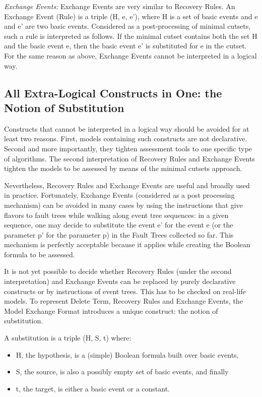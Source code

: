 \documentclass[11pt]{article}
\begin{document}
\emph{Exchange Events:} Exchange Events are very similar to Recovery Rules.
An Exchange Event (Rule) is a triple (H, e, e'), where H is a set of
basic events and e and e' are two basic events. Considered as a
post-processing of minimal cutsets, such a rule is interpreted as
follows. If the minimal cutset contains both the set H and the basic
event e, then the basic event e' is substituted for e in the cutset. For
the same reason as above, Exchange Events cannot be interpreted in a
logical way.

\subsection{All Extra-Logical Constructs in One: the Notion of Substitution}
\label{sec:org4409979}

Constructs that cannot be interpreted in a logical way should be avoided
for at least two reasons. First, models containing such constructs are
not declarative. Second and more importantly, they tighten assessment
tools to one specific type of algorithms. The second interpretation of
Recovery Rules and Exchange Events tighten the models to be assessed by
means of the minimal cutsets approach.

Nevertheless, Recovery Rules and Exchange Events are useful and broadly
used in practice. Fortunately, Exchange Events (considered as a post
processing mechanism) can be avoided in many cases by using the
instructions that give flavors to fault trees while walking along event
tree sequences: in a given sequence, one may decide to substitute the
event e' for the event e (or the parameter p' for the parameter p) in
the Fault Trees collected so far. This mechanism is perfectly acceptable
because it applies while creating the Boolean formula to be assessed.

It is not yet possible to decide whether Recovery Rules (under the
second interpretation) and Exchange Events can be replaced by purely
declarative constructs or by instructions of event trees. This has to be
checked on real-life models. To represent Delete Term, Recovery Rules
and Exchange Events, the Model Exchange Format introduces a unique
construct: the notion of substitution.

A substitution is a triple (H, S, t) where:

\begin{itemize}
\item H, the hypothesis, is a (simple) Boolean formula built over basic
events,

\item S, the source, is also a possibly empty set of basic events, and
finally

\item t, the target, is either a basic event or a constant.
\end{itemize}
\end{document}
